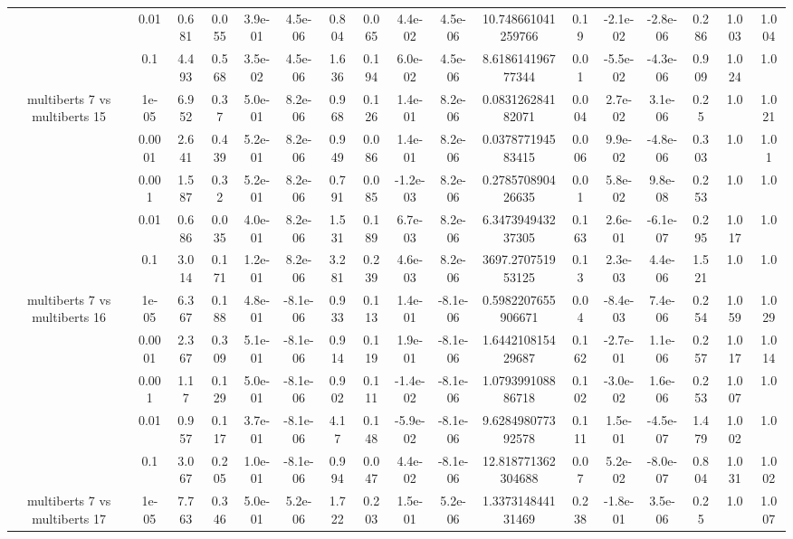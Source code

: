 \begin{tabular}{|c|c|c|c|c|c|c|c|c|c|c|c|c|c|c|c|c|}
 & 0.01 & 0.681 & 0.055 & 3.9e-01 & 4.5e-06 & 0.804 & 0.065 & 4.4e-02 & 4.5e-06 & 10.748661041259766 & 0.19 & -2.1e-02 & -2.8e-06 & 0.286 & 1.003 & 1.004 \\
 & 0.1 & 4.493 & 0.568 & 3.5e-02 & 4.5e-06 & 1.636 & 0.194 & 6.0e-02 & 4.5e-06 & 8.618614196777344 & 0.01 & -5.5e-02 & -4.3e-06 & 0.909 & 1.024 & 1.0 \\
\hline
\multirow{5}{*}{multiberts 7 vs multiberts 15} & 1e-05 & 6.952 & 0.37 & 5.0e-01 & 8.2e-06 & 0.968 & 0.126 & 1.4e-01 & 8.2e-06 & 0.083126284182071 & 0.004 & 2.7e-02 & 3.1e-06 & 0.25 & 1.0 & 1.021 \\
 & 0.0001 & 2.641 & 0.439 & 5.2e-01 & 8.2e-06 & 0.949 & 0.086 & 1.4e-01 & 8.2e-06 & 0.037877194583415 & 0.006 & 9.9e-02 & -4.8e-06 & 0.303 & 1.0 & 1.01 \\
 & 0.001 & 1.587 & 0.32 & 5.2e-01 & 8.2e-06 & 0.791 & 0.085 & -1.2e-03 & 8.2e-06 & 0.278570890426635 & 0.01 & 5.8e-02 & 9.8e-08 & 0.253 & 1.0 & 1.0 \\
 & 0.01 & 0.686 & 0.035 & 4.0e-01 & 8.2e-06 & 1.531 & 0.189 & 6.7e-03 & 8.2e-06 & 6.347394943237305 & 0.163 & 2.6e-01 & -6.1e-07 & 0.295 & 1.017 & 1.0 \\
 & 0.1 & 3.014 & 0.171 & 1.2e-01 & 8.2e-06 & 3.281 & 0.239 & 4.6e-03 & 8.2e-06 & 3697.270751953125 & 0.13 & 2.3e-03 & 4.4e-06 & 1.521 & 1.0 & 1.0 \\
\hline
\multirow{5}{*}{multiberts 7 vs multiberts 16} & 1e-05 & 6.367 & 0.188 & 4.8e-01 & -8.1e-06 & 0.933 & 0.113 & 1.4e-01 & -8.1e-06 & 0.5982207655906671 & 0.04 & -8.4e-03 & 7.4e-06 & 0.254 & 1.059 & 1.029 \\
 & 0.0001 & 2.367 & 0.309 & 5.1e-01 & -8.1e-06 & 0.914 & 0.119 & 1.9e-01 & -8.1e-06 & 1.644210815429687 & 0.162 & -2.7e-01 & 1.1e-06 & 0.257 & 1.017 & 1.014 \\
 & 0.001 & 1.17 & 0.129 & 5.0e-01 & -8.1e-06 & 0.902 & 0.111 & -1.4e-02 & -8.1e-06 & 1.079399108886718 & 0.102 & -3.0e-02 & 1.6e-06 & 0.253 & 1.007 & 1.0 \\
 & 0.01 & 0.957 & 0.117 & 3.7e-01 & -8.1e-06 & 4.17 & 0.148 & -5.9e-02 & -8.1e-06 & 9.628498077392578 & 0.111 & 1.5e-01 & -4.5e-07 & 1.479 & 1.002 & 1.0 \\
 & 0.1 & 3.067 & 0.205 & 1.0e-01 & -8.1e-06 & 0.994 & 0.047 & 4.4e-02 & -8.1e-06 & 12.818771362304688 & 0.07 & 5.2e-02 & -8.0e-07 & 0.804 & 1.031 & 1.002 \\
\hline
\multirow{5}{*}{multiberts 7 vs multiberts 17} & 1e-05 & 7.763 & 0.346 & 5.0e-01 & 5.2e-06 & 1.722 & 0.203 & 1.5e-01 & 5.2e-06 & 1.337314844131469 & 0.238 & -1.8e-01 & 3.5e-06 & 0.25 & 1.0 & 1.007 \\

\end{tabular}
